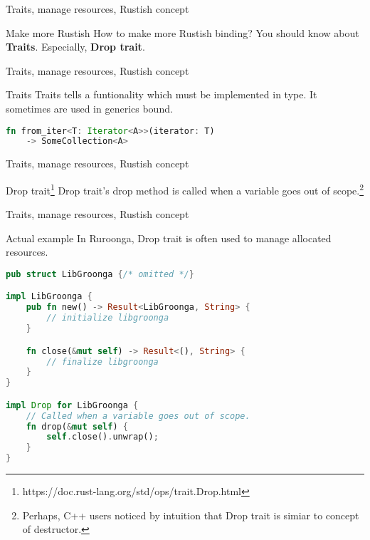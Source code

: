 \documentclass[12pt, unicode]{beamer}
\begin{document}
\begin{frame}{Traits, manage resources, Rustish concept}
\begin{block}{Make more Rustish}
  How to make more Rustish binding?
  \newline
  You should know about \textbf {Traits}. Especially, \textbf {Drop trait}.
\end{block}
\end{frame}

\begin{frame}[fragile]{Traits, manage resources, Rustish concept}
\begin{block}{Traits}
  Traits tells a funtionality which must be implemented in type.
  \newline
  It sometimes are used in generics bound.
\end{block}
\begin{lstlisting}[language={Rust},basicstyle=\ttfamily\Small]
  fn from_iter<T: Iterator<A>>(iterator: T)
    -> SomeCollection<A>
\end{lstlisting}
\end{frame}

\begin{frame}[fragile]{Traits, manage resources, Rustish concept}
\begin{block}{Drop trait\footnote[frame]{https://doc.rust-lang.org/std/ops/trait.Drop.html}}
  Drop trait's drop method is called when a variable goes out of scope.\footnote[frame]{Perhaps, C++ users noticed by intuition that Drop trait is simiar to concept of destructor.}
\end{block}

\end{frame}

\begin{frame}[fragile]{Traits, manage resources, Rustish concept}
\begin{block}{Actual example}
In Ruroonga, Drop trait is often used to manage allocated resources.
\end{block}
\begin{lstlisting}[language={Rust},basicstyle=\ttfamily\Small]
pub struct LibGroonga {/* omitted */}

impl LibGroonga {
    pub fn new() -> Result<LibGroonga, String> {
        // initialize libgroonga
    }

    fn close(&mut self) -> Result<(), String> {
        // finalize libgroonga
    }
}

impl Drop for LibGroonga {
    // Called when a variable goes out of scope.
    fn drop(&mut self) {
        self.close().unwrap();
    }
}
\end{lstlisting}
\end{frame}
\end{document}
